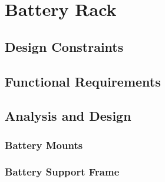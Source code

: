\section{Battery Rack}

\subsection{Design Constraints}
\subsection{Functional Requirements}
\subsection{Analysis and Design}
\subsubsection{Battery Mounts}
\subsubsection{Battery Support Frame}
